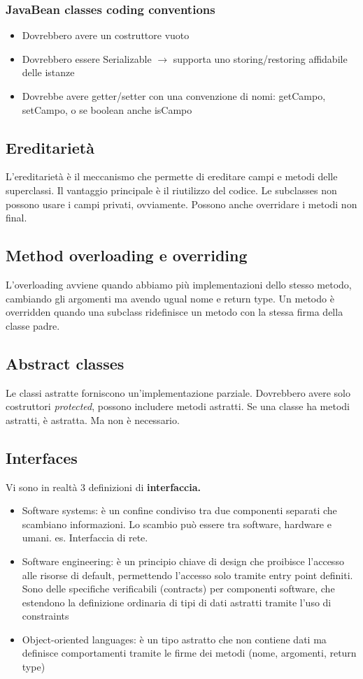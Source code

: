 \documentclass[11pt]{article}
\begin{document}
\subsubsection{JavaBean classes coding conventions}
\begin{itemize}
    \item Dovrebbero avere un costruttore vuoto
    \item Dovrebbero essere Serializable $\rightarrow$ supporta uno storing/restoring affidabile delle istanze 
    \item Dovrebbe avere getter/setter con una convenzione di nomi: getCampo, setCampo, o se boolean anche isCampo
\end{itemize}
\subsection{Ereditarietà}
L'ereditarietà è il meccanismo che permette di ereditare campi e metodi delle superclassi. Il vantaggio principale è il riutilizzo del codice. Le subclasses non possono usare i campi privati, ovviamente. Possono anche overridare i metodi non final. 
\subsection{Method overloading e overriding}
L'overloading avviene quando abbiamo più implementazioni dello stesso metodo, cambiando gli argomenti ma avendo ugual nome e return type. Un metodo è overridden quando una subclass ridefinisce un metodo con la stessa firma della classe padre. 
\subsection{Abstract classes}
Le classi astratte forniscono un'implementazione parziale. Dovrebbero avere solo costruttori \textit{protected}, possono includere metodi astratti. Se una classe ha metodi astratti, è astratta. Ma non è necessario.
\subsection{Interfaces}
Vi sono in realtà 3 definizioni di \textbf{interfaccia.}
\begin{itemize}
    \item Software systems: è un confine condiviso tra due componenti separati che scambiano informazioni. Lo scambio può essere tra software, hardware e umani. es. Interfaccia di rete.
    \item Software engineering: è un principio chiave di design che proibisce l'accesso alle risorse di default, permettendo l'accesso solo tramite entry point definiti. Sono delle specifiche verificabili (contracts) per componenti software, che estendono la definizione ordinaria di tipi di dati astratti tramite l'uso di constraints
    \item Object-oriented languages: è un tipo astratto che non contiene dati ma definisce comportamenti tramite le firme dei metodi (nome, argomenti, return type)
\end{itemize}
\end{document}
